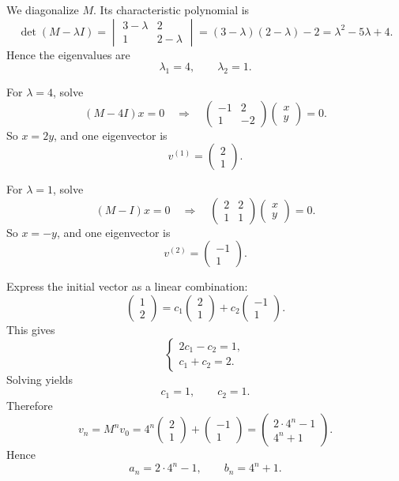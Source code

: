 \documentclass[12pt]{article}
\begin{document}
We diagonalize \(M\). Its characteristic polynomial is
\[
\det(M-\lambda I)
=
\begin{vmatrix}
3-\lambda & 2\\
1 & 2-\lambda
\end{vmatrix}
=(3-\lambda)(2-\lambda)-2
=\lambda^2-5\lambda+4.
\]
Hence the eigenvalues are
\[
\lambda_1=4,\qquad \lambda_2=1.
\]

For \(\lambda=4\), solve
\[
(M-4I)x=0
\quad\Longrightarrow\quad
\begin{pmatrix}
-1 & 2\\
1 & -2
\end{pmatrix}
\begin{pmatrix}
x\\y
\end{pmatrix}
=0.
\]
So \(x=2y\), and one eigenvector is
\[
v^{(1)}=\begin{pmatrix}2\\1\end{pmatrix}.
\]

For \(\lambda=1\), solve
\[
(M-I)x=0
\quad\Longrightarrow\quad
\begin{pmatrix}
2 & 2\\
1 & 1
\end{pmatrix}
\begin{pmatrix}
x\\y
\end{pmatrix}
=0.
\]
So \(x=-y\), and one eigenvector is
\[
v^{(2)}=\begin{pmatrix}-1\\1\end{pmatrix}.
\]

Express the initial vector as a linear combination:
\[
\begin{pmatrix}1\\2\end{pmatrix}
=c_1\begin{pmatrix}2\\1\end{pmatrix}
+c_2\begin{pmatrix}-1\\1\end{pmatrix}.
\]
This gives
\[
\begin{cases}
2c_1-c_2=1,\\
c_1+c_2=2.
\end{cases}
\]
Solving yields
\[
c_1=1,\qquad c_2=1.
\]
Therefore
\[
v_n=M^n v_0
=
4^n\begin{pmatrix}2\\1\end{pmatrix}
+\begin{pmatrix}-1\\1\end{pmatrix}
=
\begin{pmatrix}
2\cdot 4^n-1\\
4^n+1
\end{pmatrix}.
\]
Hence
\[
\boxed{a_n=2\cdot 4^n-1,\qquad b_n=4^n+1.}
\]
\end{document}
